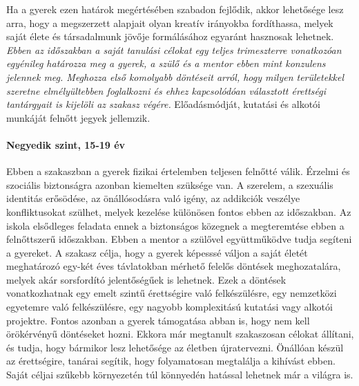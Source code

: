 Ha a gyerek ezen határok megértésében szabadon fejlődik, akkor lehetősége lesz arra, hogy a megszerzett alapjait olyan kreatív irányokba fordíthassa, melyek saját élete és társadalmunk jövője formálásához egyaránt hasznosak lehetnek. \emph{Ebben az időszakban a saját tanulási célokat egy teljes trimeszterre vonatkozóan egyénileg határozza meg a gyerek, a szülő és a mentor ebben mint konzulens jelennek meg. Meghozza első komolyabb döntéseit arról, hogy milyen területekkel szeretne elmélyültebben foglalkozni és ehhez kapcsolódóan választott érettségi tantárgyait is kijelöli az szakasz végére.} Előadásmódját, kutatási és alkotói munkáját felnőtt jegyek jellemzik.

\paragraph{Negyedik szint, 15-19 év} Ebben a szakaszban a gyerek fizikai
értelemben teljesen felnőtté válik. Érzelmi és szociális biztonságra azonban kiemelten szüksége van. A szerelem, a szexuális identitás erősödése, az önállósodásra való igény, az addikciók veszélye konfliktusokat szülhet, melyek kezelése különösen fontos ebben az időszakban. Az iskola elsődleges feladata ennek a biztonságos közegnek a megteremtése ebben a felnőttszerű időszakban. Ebben a mentor a szülővel együttműködve tudja segíteni a gyereket. A szakasz célja, hogy a gyerek képesssé váljon a saját életét	meghatározó egy-két éves távlatokban mérhető felelős döntések meghozatalára, melyek akár sorsfordító jelentőségűek is lehetnek. Ezek a döntések  vonatkozhatnak egy emelt szintű érettségire való felkészülésre, egy nemzetközi egyetemre való felkészülésre, egy nagyobb komplexitású kutatási vagy alkotói projektre. Fontos azonban a gyerek támogatása abban is, hogy nem kell örökérvényű döntéseket hozni. Ekkora már megtanult szakaszosan célokat állítani, és tudja, hogy bármikor lesz lehetősége az életben újratervezni. Önállóan készül az érettségire, tanárai segítik, hogy folyamatosan megtalálja a kihívást ebben. Saját céljai szűkebb környezetén túl könnyedén hatással lehetnek már a világra is.
